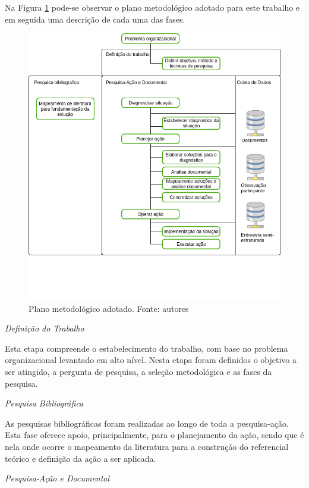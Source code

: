 Na Figura \ref{plano_metodologico} pode-se observar o plano metodológico adotado para este trabalho e em seguida
uma descrição de cada uma das fases.

\begin{figure}[!htb]
	\centering
	\includegraphics[scale=0.6]{figuras/Plano_metodologico}
	\caption{Plano metodológico adotado. Fonte: autores}
	\label{plano_metodologico}
\end{figure}

\newpage

\textit{Definição do Trabalho}

Esta etapa compreende o estabelecimento do trabalho, com base no problema
organizacional levantado em alto nível. Nesta etapa foram definidos o objetivo a ser atingido, a pergunta de pesquisa, a seleção metodológica e as fases da pesquisa.

\textit{Pesquisa Bibliográfica}

As pesquisas bibliográficas foram realizadas ao longo de toda a pesquisa-ação. Esta fase oferece apoio, principalmente, para o planejamento da ação, sendo que é nela onde ocorre o mapeamento da literatura para a construção do referencial teórico e definição da ação a ser aplicada.

\textit{Pesquisa-Ação e Documental}

